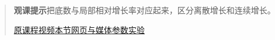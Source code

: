 \begin{quote}\small\textbf{观课提示}\quad 把底数与局部相对增长率对应起来，区分离散增长和连续增长。

\href{https://www.youtube.com/watch?v=m2MIpDrF7Es}{原课程视频}\quad\href{https://vitael04213.github.io/3blue1brown-notes/lessons/eulers-number.html}{本节网页与媒体}\quad\href{https://vitael04213.github.io/3blue1brown-notes/lab.html\#derivative}{参数实验}
\end{quote}
